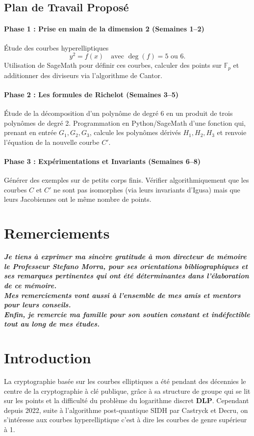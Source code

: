 \documentclass[12pt,a4paper]{article}
\begin{document}
	\subsection{Plan de Travail Proposé}
	
	\paragraph{Phase 1 : Prise en main de la dimension 2 (Semaines 1--2)}
	Étude des courbes hyperelliptiques
	\[
	y^2 = f(x) \quad \text{avec } \deg(f)=5 \text{ ou } 6.
	\]
	Utilisation de SageMath pour définir ces courbes, calculer des points sur $\mathbb{F}_p$
	et additionner des diviseurs via l'algorithme de Cantor.
	
	\paragraph{Phase 2 : Les formules de Richelot (Semaines 3--5)}
	Étude de la décomposition d'un polynôme de degré 6 en un produit de trois polynômes de degré 2.
	Programmation en Python/SageMath d'une fonction qui, prenant en entrée $G_1, G_2, G_3$,
	calcule les polynômes dérivés $H_1, H_2, H_3$ et renvoie l'équation de la nouvelle courbe $C'$.
	
	\paragraph{Phase 3 : Expérimentations et Invariants (Semaines 6--8)}
	Générer des exemples sur de petits corps finis. Vérifier algorithmiquement que les courbes
	$C$ et $C'$ ne sont pas isomorphes (via leurs invariants d'Igusa) mais que leurs Jacobiennes
	ont le même nombre de points.
	\newpage
	\section*{Remerciements}
	\textit{\textbf{Je tiens \`a exprimer ma sincère gratitude \`a mon directeur de mémoire le Professeur Stefano Morra, pour ses orientations bibliographiques et ses remarques pertinentes qui ont été déterminantes dans l'élaboration de ce mémoire.\\
	Mes remerciements vont aussi \`a l'ensemble de mes amis et mentors pour leurs conseils.\\
	Enfin, je remercie ma famille pour son soutien constant et indéfectible tout au long de mes études.}}
	\newpage
	\section{Introduction}
	La cryptographie basée sur les courbes elliptiques a été pendant des décennies le centre de la cryptographie \`a clé publique, grâce \`a sa structure de groupe qui se lit sur les points et la difficulté du problème du logarithme discret \textbf{DLP}. Cependant depuis 2022, suite \`a l'algorithme post-quantique SIDH par Castryck et
	Decru, on s'intéresse aux courbes hyperelliptique c'est \`a dire les courbes de genre supérieur \`a 1. 
	
\end{document}

